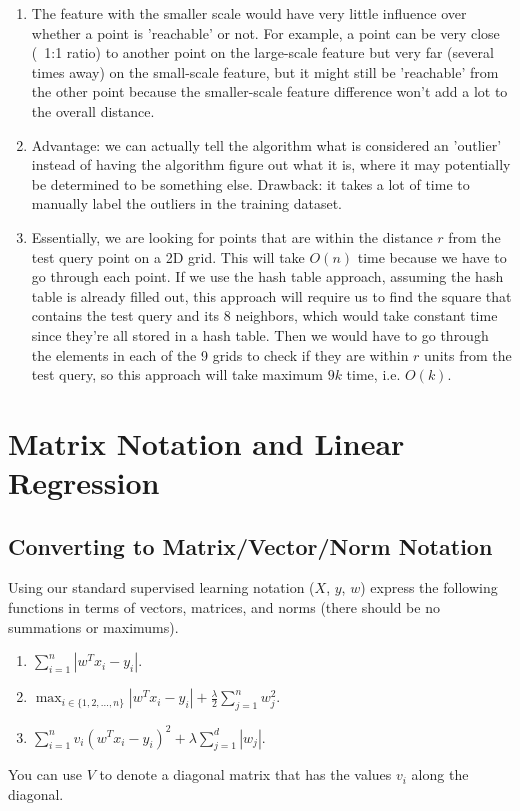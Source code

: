 \documentclass{article}
\def\blu#1{{\color{blu}#1}}
\def\enum#1{\begin{enumerate}#1\end{enumerate}}
\begin{document}
\enum{
\item The feature with the smaller scale would have very little influence over whether a point is 'reachable' or not. For example, a point can be very close (~1:1 ratio) to another point on the large-scale feature but very far (several times away) on the small-scale feature, but it might still be 'reachable' from the other point because the smaller-scale feature difference won't add a lot to the overall distance.
\item Advantage: we can actually tell the algorithm what is considered an 'outlier' instead of having the algorithm figure out what it is, where it may potentially be determined to be something else. Drawback: it takes a lot of time to manually label the outliers in the training dataset.
\item Essentially, we are looking for points that are within the distance $r$ from the test query point on a 2D grid. This will take $O(n)$ time because we have to go through each point. If we use the hash table approach, assuming the hash table is already filled out, this approach will require us to find the square that contains the test query and its 8 neighbors, which would take constant time since they're all stored in a hash table. Then we would have to go through the elements in each of the 9 grids to check if they are within $r$ units from the test query, so this approach will take maximum $9k$ time, i.e. $O(k)$.
}

\section{Matrix Notation and Linear Regression}

\subsection{Converting to Matrix/Vector/Norm Notation}

Using our standard supervised learning notation ($X$, $y$, $w$)
express the following functions in terms of vectors, matrices, and norms (there should be no summations or maximums).
\blu{\enum{
\item $\sum_{i=1}^n |w^Tx_i - y_i|$.
\item $\max_{i \in \{1,2,\dots,n\}} |w^Tx_i  - y_i| + \frac{\lambda}{2}\sum_{j=1}^n w_j^2$.
\item $\sum_{i=1}^n v_i (w^Tx_i - y_i)^2 + \lambda \sum_{j=1}^{d} |w_j|$.
}}
You can use $V$ to denote a diagonal matrix that has the values $v_i$ along the diagonal.
\end{document}
